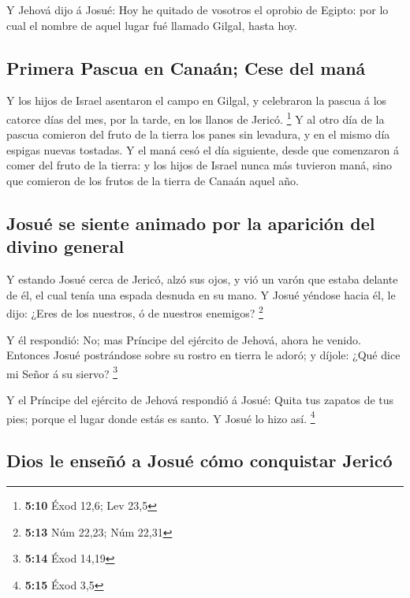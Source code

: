  Y Jehová dijo á Josué: Hoy he quitado de vosotros el
oprobio de Egipto: por lo cual el nombre de aquel lugar fué llamado
Gilgal, hasta hoy.

\hypertarget{primera-pascua-en-canauxe1n-cese-del-manuxe1}{%
\subsection{Primera Pascua en Canaán; Cese del
maná}\label{primera-pascua-en-canauxe1n-cese-del-manuxe1}}

 Y los hijos de Israel asentaron el campo en Gilgal, y
celebraron la pascua á los catorce días del mes, por la tarde, en los
llanos de Jericó. \footnote{\textbf{5:10} Éxod 12,6; Lev 23,5}
 Y al otro día de la pascua comieron del fruto de la tierra
los panes sin levadura, y en el mismo día espigas nuevas tostadas.
 Y el maná cesó el día siguiente, desde que comenzaron á
comer del fruto de la tierra: y los hijos de Israel nunca más tuvieron
maná, sino que comieron de los frutos de la tierra de Canaán aquel año.

\hypertarget{josuuxe9-se-siente-animado-por-la-apariciuxf3n-del-divino-general}{%
\subsection{Josué se siente animado por la aparición del divino
general}\label{josuuxe9-se-siente-animado-por-la-apariciuxf3n-del-divino-general}}

 Y estando Josué cerca de Jericó, alzó sus ojos, y vió un
varón que estaba delante de él, el cual tenía una espada desnuda en su
mano. Y Josué yéndose hacia él, le dijo: ¿Eres de los nuestros, ó de
nuestros enemigos? \footnote{\textbf{5:13} Núm 22,23; Núm 22,31}

 Y él respondió: No; mas Príncipe del ejército de Jehová,
ahora he venido. Entonces Josué postrándose sobre su rostro en tierra le
adoró; y díjole: ¿Qué dice mi Señor á su siervo? \footnote{\textbf{5:14}
  Éxod 14,19}

 Y el Príncipe del ejército de Jehová respondió á Josué:
Quita tus zapatos de tus pies; porque el lugar donde estás es santo. Y
Josué lo hizo así. \footnote{\textbf{5:15} Éxod 3,5}

\hypertarget{dios-le-enseuxf1uxf3-a-josuuxe9-cuxf3mo-conquistar-jericuxf3}{%
\subsection{Dios le enseñó a Josué cómo conquistar
Jericó}\label{dios-le-enseuxf1uxf3-a-josuuxe9-cuxf3mo-conquistar-jericuxf3}}

